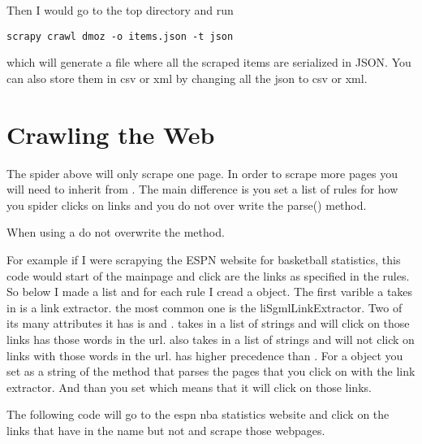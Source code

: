 Then I would go to the top directory and run
\begin{lstlisting}
scrapy crawl dmoz -o items.json -t json
\end{lstlisting}
which will generate a file  where all the scraped items are serialized in JSON. You can also store them in csv or xml by changing all the json to csv or xml.

\section*{Crawling the Web}
The spider above will only scrape one page. In order to scrape more pages you will need to inherit from . The main difference is you set a list of rules for how you spider clicks on links and you do not over write the parse() method.

\begin{warn}
When using a  do not overwrite the  method.
\end{warn}

For example if I were scrapying the ESPN website for basketball statistics, this code would start of the mainpage and click are the links as specified in the rules. So below I made a list and for each rule I cread a  object. The first varible a takes in is a link extractor. the most common one is the li{SgmlLinkExtractor}. Two of its many attributes it has is  and .  takes in a list of strings and will click on those links has those words in the url.  also takes in a list of strings and will not click on links with those words in the url.  has higher precedence than . For a  object you set  as a string of the method that parses the pages that you click on with the link extractor.  And than you set  which means that it will click on those links.

The following code will go to the espn nba statistics website and click on the links that have  in the name but not  and scrape those webpages.

